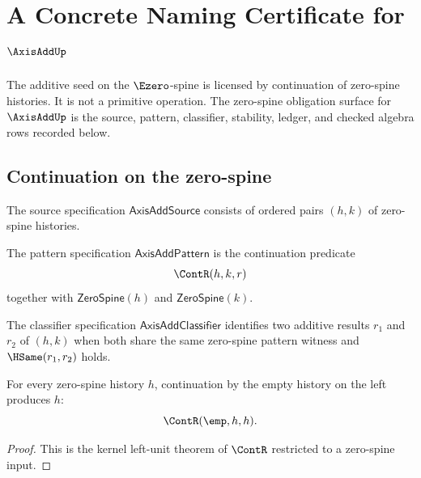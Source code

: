 \chapter{A Concrete Naming Certificate for \(\AxisAddUp\)}
\label{ch:concrete-instances-axisadd-namecert}

The additive seed on the \(\Ezero\)-spine is licensed by continuation of zero-spine histories. It is not a primitive operation. The zero-spine obligation surface for \(\AxisAddUp\) is the source, pattern, classifier, stability, ledger, and checked algebra rows recorded below.

\section{Continuation on the zero-spine}

\begin{definition}
\label{def:axisadd-source-specification}
The source specification \(\mathsf{AxisAddSource}\) consists of ordered pairs \((h, k)\) of zero-spine histories.
\end{definition}

\begin{definition}
\label{def:axisadd-pattern-specification}
The pattern specification \(\mathsf{AxisAddPattern}\) is the continuation predicate
$$
  \ContR(h, k, r)
$$
together with \(\mathsf{ZeroSpine}(h)\) and \(\mathsf{ZeroSpine}(k)\).
\end{definition}

\begin{definition}
\label{def:axisadd-classifier-specification}
The classifier specification \(\mathsf{AxisAddClassifier}\) identifies two additive results \(r_1\) and \(r_2\) of \((h, k)\) when both share the same zero-spine pattern witness and \(\HSame(r_1, r_2)\) holds.
\end{definition}

\begin{theorem}
\label{thm:axisadd-left-unit}
For every zero-spine history \(h\), continuation by the empty history on the left produces \(h\):
$$
  \ContR(\emp, h, h).
$$
\end{theorem}
\begin{proof}
This is the kernel left-unit theorem of \(\ContR\) restricted to a zero-spine input.
\end{proof}

